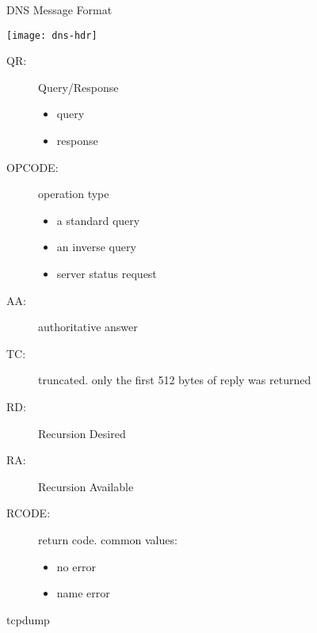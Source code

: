 \begin{frame}{DNS Message Format}
  \begin{center}
    \texttt{[image: dns-hdr]}
  \end{center}

  \begin{multicols}{2}{\scriptsize 
      \begin{description}
      \item[QR:] Query/Response
        \begin{itemize}
        \item[0:] {\scriptsize query}
        \item[1:] {\scriptsize response}
        \end{itemize}
      \item[OPCODE:] operation type
        \begin{itemize}
        \item[0:] {\scriptsize a standard query}
        \item[1:] {\scriptsize an inverse query}
        \item[2:] {\scriptsize server status request}
        \end{itemize}
      \item[AA:] authoritative answer
      \item[TC:] truncated. only the first 512 bytes of reply was returned
      \item[RD:] Recursion Desired
      \item[RA:] Recursion Available
      \item[RCODE:] return code. common values:
        \begin{itemize}
        \item[0:] {\scriptsize no error}
        \item[3:] {\scriptsize name error}
        \end{itemize}
      \end{description}}
\end{multicols}
\end{frame}

\begin{frame}
  \begin{center}
  \end{center}
\end{frame}

\begin{frame}{tcpdump}
  \begin{center}
  \end{center}
\end{frame}


